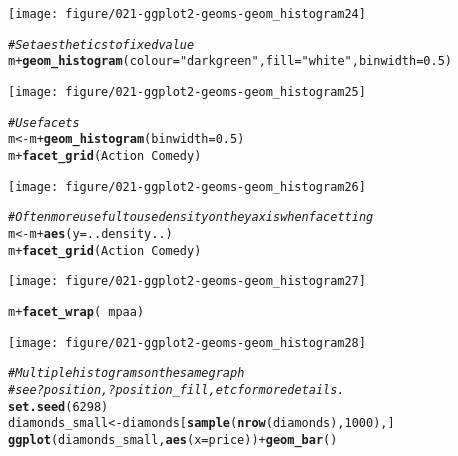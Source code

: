 \documentclass[a4paper,titlepage]{tufte-handout}\usepackage[]{graphicx}\usepackage[]{color}
\makeatletter
\def\maxwidth{ %
  \ifdim\Gin@nat@width>\linewidth
    \linewidth
  \else
    \Gin@nat@width
  \fi
}
\newcommand{\hlnum}[1]{\textcolor[rgb]{0.686,0.059,0.569}{#1}}%
\newcommand{\hlstr}[1]{\textcolor[rgb]{0.192,0.494,0.8}{#1}}%
\newcommand{\hlcom}[1]{\textcolor[rgb]{0.678,0.584,0.686}{\textit{#1}}}%
\newcommand{\hlopt}[1]{\textcolor[rgb]{0,0,0}{#1}}%
\newcommand{\hlstd}[1]{\textcolor[rgb]{0.345,0.345,0.345}{#1}}%
\newcommand{\hlkwb}[1]{\textcolor[rgb]{0.69,0.353,0.396}{#1}}%
\newcommand{\hlkwc}[1]{\textcolor[rgb]{0.333,0.667,0.333}{#1}}%
\newcommand{\hlkwd}[1]{\textcolor[rgb]{0.737,0.353,0.396}{\textbf{#1}}}%
\newenvironment{kframe}{%
 \def\at@end@of@kframe{}%
 \ifinner\ifhmode%
  \def\at@end@of@kframe{\end{minipage}}%
  \begin{minipage}{\columnwidth}%
 \fi\fi%
 \def\FrameCommand##1{\hskip\@totalleftmargin \hskip-\fboxsep
 \colorbox{shadecolor}{##1}\hskip-\fboxsep
     \hskip-\linewidth \hskip-\@totalleftmargin \hskip\columnwidth}%
 \MakeFramed {\advance\hsize-\width
   \@totalleftmargin\z@ \linewidth\hsize
   \@setminipage}}%
 {\par\unskip\endMakeFramed%
 \at@end@of@kframe}
\newenvironment{knitrout}{}{} %
\makeatother
\begin{document}
\begin{knitrout}
\begin{kframe}
{\ttfamily\noindent\color{warningcolor}{\#\# Warning: Stacking not well defined when ymin != 0}}\end{kframe}
\texttt{[image: figure/021-ggplot2-geoms-geom\_histogram24]} 
\begin{kframe}\begin{alltt}
\hlcom{# Set aesthetics to fixed value}
\hlstd{m} \hlopt{+} \hlkwd{geom_histogram}\hlstd{(}\hlkwc{colour} \hlstd{=} \hlstr{"darkgreen"}\hlstd{,} \hlkwc{fill} \hlstd{=} \hlstr{"white"}\hlstd{,} \hlkwc{binwidth} \hlstd{=} \hlnum{0.5}\hlstd{)}
\end{alltt}
\end{kframe}
\texttt{[image: figure/021-ggplot2-geoms-geom\_histogram25]} 
\begin{kframe}\begin{alltt}
\hlcom{# Use facets}
\hlstd{m} \hlkwb{<-} \hlstd{m} \hlopt{+} \hlkwd{geom_histogram}\hlstd{(}\hlkwc{binwidth} \hlstd{=} \hlnum{0.5}\hlstd{)}
\hlstd{m} \hlopt{+} \hlkwd{facet_grid}\hlstd{(Action} \hlopt{~} \hlstd{Comedy)}
\end{alltt}
\end{kframe}
\texttt{[image: figure/021-ggplot2-geoms-geom\_histogram26]} 
\begin{kframe}\begin{alltt}
\hlcom{# Often more useful to use density on the y axis when facetting}
\hlstd{m} \hlkwb{<-} \hlstd{m} \hlopt{+} \hlkwd{aes}\hlstd{(}\hlkwc{y} \hlstd{= ..density..)}
\hlstd{m} \hlopt{+} \hlkwd{facet_grid}\hlstd{(Action} \hlopt{~} \hlstd{Comedy)}
\end{alltt}
\end{kframe}
\texttt{[image: figure/021-ggplot2-geoms-geom\_histogram27]} 
\begin{kframe}\begin{alltt}
\hlstd{m} \hlopt{+} \hlkwd{facet_wrap}\hlstd{(}\hlopt{~} \hlstd{mpaa)}
\end{alltt}
\end{kframe}
\texttt{[image: figure/021-ggplot2-geoms-geom\_histogram28]} 
\begin{kframe}\begin{alltt}
\hlcom{# Multiple histograms on the same graph}
\hlcom{# see ?position, ?position_fill, etc for more details.}
\hlkwd{set.seed}\hlstd{(}\hlnum{6298}\hlstd{)}
\hlstd{diamonds_small} \hlkwb{<-} \hlstd{diamonds[}\hlkwd{sample}\hlstd{(}\hlkwd{nrow}\hlstd{(diamonds),} \hlnum{1000}\hlstd{), ]}
\hlkwd{ggplot}\hlstd{(diamonds_small,} \hlkwd{aes}\hlstd{(}\hlkwc{x}\hlstd{=price))} \hlopt{+} \hlkwd{geom_bar}\hlstd{()}
\end{alltt}



\end{kframe}
\end{knitrout}
\end{document}
